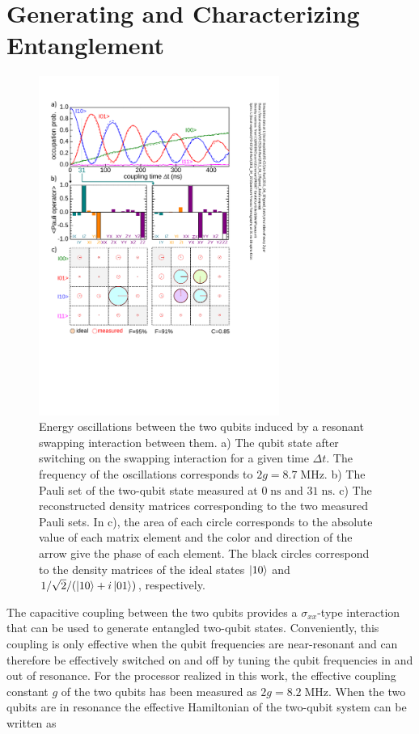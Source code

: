 \section{Generating and Characterizing Entanglement}

\begin{figure}
	\centering
		\includegraphics[width=0.7\textwidth]{./material/papers/iswap/submission1/Dewes_Figure2}
	\caption[Generating entangled two-qubit states by swapping interaction]{Energy oscillations between the two qubits induced by a resonant swapping interaction between them. a) The qubit state after switching on the swapping interaction for a given time $\Delta t$. The frequency of the oscillations corresponds to $2g = 8.7 \; \mathrm{MHz}$. b) The Pauli set of the two-qubit state measured at $0\; \mathrm{ns}$ and $31\; \mathrm{ns}$. c) The reconstructed density matrices corresponding to the two measured Pauli sets. In c), the area of each circle corresponds to the absolute value of each matrix element and the color and direction of the arrow give the phase of each element. The black circles correspond to the density matrices of the ideal states $\left| 10 \right>$ and $1/\sqrt{2}/(\left| 10 \right>+i\left| 01 \right>)$, respectively.}
	\label{fig:swap_interaction_state_tomography}
\end{figure}

The capacitive coupling between the two qubits provides a $\sigma_{xx}$-type interaction that can be used to generate entangled two-qubit states. Conveniently, this coupling is only effective when the qubit frequencies are near-resonant and can therefore be effectively switched on and off by tuning the qubit frequencies in and out of resonance. For the processor realized in this work, the effective coupling constant $g$ of the two qubits has been measured as $2g = 8.2 \; \mathrm{MHz}$. When the two qubits are in resonance the effective Hamiltonian of the two-qubit system can be written as

